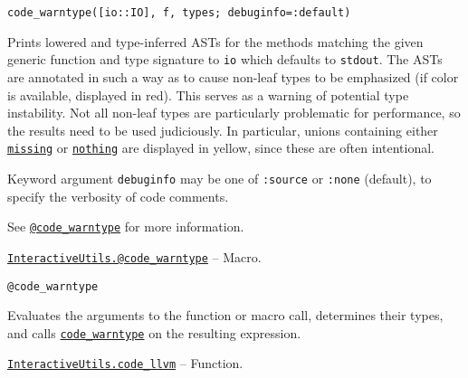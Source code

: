 \begin{adjustwidth}{2em}{0pt}


\begin{verbatim}
code_warntype([io::IO], f, types; debuginfo=:default)
\end{verbatim}

Prints lowered and type-inferred ASTs for the methods matching the given generic function and type signature to \texttt{io} which defaults to \texttt{stdout}. The ASTs are annotated in such a way as to cause {\textquotedbl}non-leaf{\textquotedbl} types to be emphasized (if color is available, displayed in red). This serves as a warning of potential type instability. Not all non-leaf types are particularly problematic for performance, so the results need to be used judiciously. In particular, unions containing either \hyperlink{14596725676261444434}{\texttt{missing}} or \hyperlink{9331422207248206047}{\texttt{nothing}} are displayed in yellow, since these are often intentional.

Keyword argument \texttt{debuginfo} may be one of \texttt{:source} or \texttt{:none} (default), to specify the verbosity of code comments.

See \hyperlink{7310642359836438564}{\texttt{@code\_warntype}} for more information.



\end{adjustwidth}
\hypertarget{8092893264277772840}{} 
\hyperlink{8092893264277772840}{\texttt{InteractiveUtils.@code\_warntype}}  -- {Macro.}

\begin{adjustwidth}{2em}{0pt}


\begin{verbatim}
@code_warntype
\end{verbatim}

Evaluates the arguments to the function or macro call, determines their types, and calls \hyperlink{5565852192659724503}{\texttt{code\_warntype}} on the resulting expression.



\end{adjustwidth}
\hypertarget{1749471484368489435}{} 
\hyperlink{1749471484368489435}{\texttt{InteractiveUtils.code\_llvm}}  -- {Function.}

